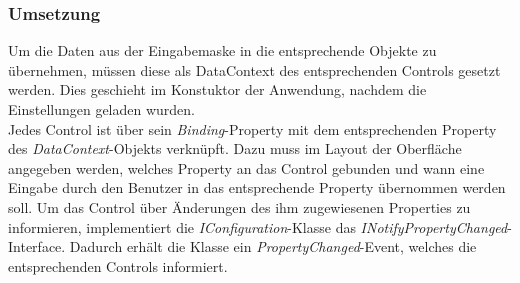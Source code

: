 \subsubsection{Umsetzung}
Um die Daten aus der Eingabemaske in die entsprechende Objekte zu übernehmen, müssen diese als DataContext des entsprechenden Controls gesetzt werden. Dies geschieht im Konstuktor der Anwendung, nachdem die Einstellungen geladen wurden.\\
Jedes Control ist über sein \textit{Binding}-Property mit dem entsprechenden Property des \textit{DataContext}-Objekts verknüpft. Dazu muss im Layout der Oberfläche angegeben werden, welches Property an das Control gebunden und wann eine Eingabe durch den Benutzer in das entsprechende Property übernommen werden soll. Um das Control über Änderungen des ihm zugewiesenen Properties zu informieren, implementiert die \textit{IConfiguration}-Klasse das \textit{INotifyPropertyChanged}-Interface. Dadurch erhält die Klasse ein \textit{PropertyChanged}-Event, welches die entsprechenden Controls informiert. \\

